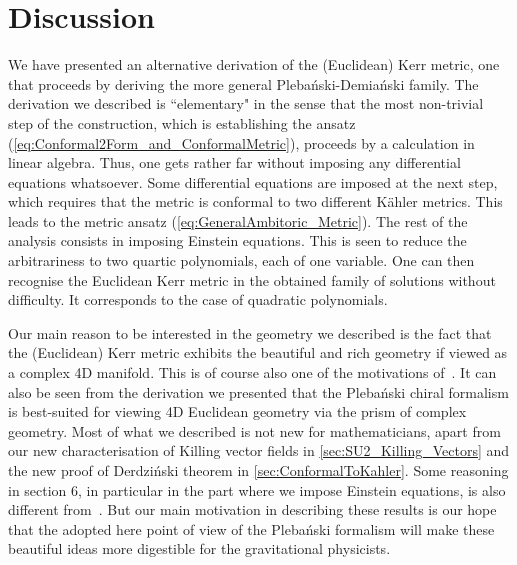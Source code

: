 \documentclass[10pt]{report}
\newcommand{\pleb}[0]{Pleba\'nski}
\newcommand{\demi}[0]{Demia\'nski}
\newcommand{\derd}[0]{Derdzi\'nski}
\theoremstyle{definition}
\begin{document}
\section{Discussion}
We have presented an alternative derivation of the (Euclidean) Kerr metric, one that proceeds by deriving the more general \pleb{}-\demi{} family. The derivation we described is ``elementary" in the sense that the most non-trivial step of the construction, which is establishing the ansatz (\ref{eq:Conformal2Form_and_ConformalMetric}), proceeds by a calculation in linear algebra. Thus, one gets rather far without imposing any differential equations whatsoever. Some differential equations are imposed at the next step, which requires that the metric is conformal to two different K\"ahler metrics. This leads to the metric ansatz (\ref{eq:GeneralAmbitoric_Metric}). The rest of the analysis consists in imposing Einstein equations. This is seen to reduce the arbitrariness to two quartic polynomials, each of one variable. One can then recognise the Euclidean Kerr metric in the obtained family of solutions without difficulty. It corresponds to the case of quadratic polynomials. 

Our main reason to be interested in the geometry we described is the fact that the (Euclidean) Kerr metric exhibits the beautiful and rich geometry if viewed as a complex 4D manifold.  This is of course also one of the motivations of~\cite{AmbitoricGeomeAposto2013}. It can also be seen from the derivation we presented that the \pleb{} chiral formalism is best-suited for viewing 4D Euclidean geometry via the prism of complex geometry. Most of what we described is not new for mathematicians, apart from our new characterisation of Killing vector fields in \cref{sec:SU2_Killing_Vectors} and the new proof of \derd{} theorem in \cref{sec:ConformalToKahler}. Some reasoning in section 6, in particular in the part where we impose Einstein equations, is also different from~\cite{AmbitoricGeomeAposto2013}. But our main motivation in describing these results is our hope that the adopted here point of view of the \pleb{} formalism will make these beautiful ideas more digestible for the gravitational physicists. 


    \newpage
\end{document}
